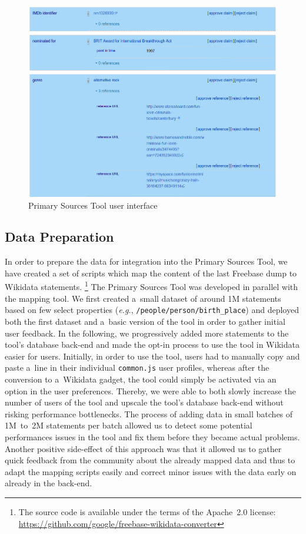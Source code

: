 \documentclass{sig-alternate}
\begin{document}
\begin{figure}[!htbp]
\centering
\includegraphics[width=8.45 cm]{img/primary-sources.png}
\caption{Primary Sources Tool user interface}
\label{fig:primary-sources-tool}
\end{figure}

\subsection{Data Preparation}

In order to prepare the data for integration into the Primary Sources Tool,
we have created a set of scripts which map the content
of the last Freebase dump to Wikidata statements.%
\footnote{The source code is available under the terms of the Apache~2.0 license:
\url{https://github.com/google/freebase-wikidata-converter}}
The Primary Sources Tool was developed in parallel with the mapping tool.
We first created a~small dataset of around 1M statements
based on few select properties (\emph{e.g.}, \texttt{/people/person/birth\_place})
and deployed both the first dataset and a~basic version of the tool
in order to gather initial user feedback.
In the following, we progressively added more statements to the tool's database back-end
and made the opt-in process to use the tool in Wikidata easier for users.
Initially, in order to use the tool, users had to manually copy and paste a~line
in their individual \texttt{common.js} user profiles,
whereas after the conversion to a~Wikidata gadget,
the tool could simply be activated via an option in the user preferences.
Thereby, we were able to both slowly increase the number of users of the tool
and upscale the tool's database back-end without risking performance bottlenecks.
The process of adding data in small batches of 1M~to~2M statements per batch allowed us
to detect some potential performances issues in the tool and fix them
before they became actual problems.
Another positive side-effect of this approach was that it allowed us to gather quick feedback
from the community about the already mapped data and thus to adapt the mapping scripts easily
and correct minor issues with the data early on already in the back-end.
\end{document}
